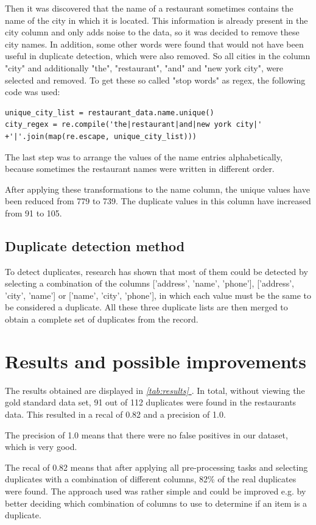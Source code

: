 \documentclass[conference]{IEEEtran}
\newcommand*{\fullref}[1]{\textit{\hyperref[{#1}]{\autoref*{#1} \nameref*{#1}}}}
\begin{document}
Then it was discovered that the name of a restaurant sometimes contains the name of the city in which it is located. This information is already present in the city column and only adds noise to the data, so it was decided to remove these city names. In addition, some other words were found that would not have been useful in duplicate detection, which were also removed. So all cities in the column "city" and additionally "the", "restaurant", "and" and "new york city", were selected and removed. To get these so called "stop words" as regex, the following code was used: 
\begin{lstlisting}
unique_city_list = restaurant_data.name.unique()
city_regex = re.compile('the|restaurant|and|new york city|' +'|'.join(map(re.escape, unique_city_list)))
\end{lstlisting}
The last step was to arrange the values of the name entries alphabetically, because sometimes the restaurant names were written in different order. 

After applying these transformations to the name column, the unique values have been reduced from 779 to 739. The duplicate values in this column have increased from 91 to 105.
\subsection{Duplicate detection method} \label{sec:dup_detection_method}
To detect duplicates, research has shown that most of them could be detected by selecting a combination of the columns ['address', 'name', 'phone'], ['address', 'city', 'name'] or ['name', 'city', 'phone'], in which each value must be the same to be considered a duplicate. All these three duplicate lists are then merged to obtain a complete set of duplicates from the record.
\section{Results and possible improvements}\label{sec:results}
The results obtained are displayed in \fullref{tab:results}. In total, without viewing the gold standard data set, 91 out of 112 duplicates were found in the restaurants data. This resulted in a recal of 0.82 and a precision of 1.0. 

The precision of 1.0 means that there were no false positives in our dataset, which is very good. 

The recal of 0.82 means that after applying all pre-processing tasks and selecting duplicates with a combination of different columns, 82\% of the real duplicates were found. The approach used was rather simple and could be improved e.g. by better deciding which combination of columns to use to determine if an item is a duplicate. 
\end{document}
